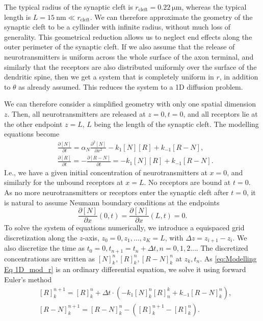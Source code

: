 \documentclass{article}
\begin{document}
The typical radius of the synaptic cleft is $r_{\text{cleft}}=\SI{0.22}{\micro \meter}$, whereas the typical length is $L = \SI{15}{\nano \meter} \ll r_{\text{cleft}}$. We can therefore approximate the geometry of the synaptic cleft to be a cyllinder with infinite radius, without much loss of generality. This geometrical reduction allows us to neglect end effects along the outer perimeter of the synaptic cleft. If we also assume that the release of neurotransmitters is uniform across the whole surface of the axon terminal, and similarly that the receptors are also distributed uniformly over the surface of the dendritic spine, then we get a system that is completely uniform in $r$, in addition to $\theta$ as already assumed. This reduces the system to a 1D diffusion problem.

We can therefore consider a simplified geometry with only one spatial dimension $z$.
Then, all neurotransmitters are released at $z = 0, t = 0$, and all receptors lie at the other endpoint $z = L$, $L$ being the length of the synaptic cleft.
The modelling equations become 
\begin{align}\label{eq:Modelling Eq 1D_mod_n}
        & \frac{\partial [N]}{\partial t} = \alpha_N \frac{\partial^2 [N]}{\partial x^2} - k_1 [N][R] + k_{-1}[R-N], \\
        \label{eq:Modelling Eq 1D_mod_r}
        &\frac{\partial [R]}{\partial t} = -\frac{\partial[R-N]}{\partial t} = -k_1 [N][R] + k_{-1}[R-N].
\end{align}
I.e., we have a given initial concentration of neurotransmitters at $x = 0$, and similarly for the unbound receptors at $x = L$.
No receptors are bound at $t = 0$.
As no more neurotransmitters or receptors enter the synaptic cleft after $t = 0$, it is natural to assume Neumann boundary conditions at the endpoints
\begin{equation}\label{eq:boundary}
        \frac{\partial [N]}{\partial x}(0, t) = \frac{\partial [N]}{\partial x} (L, t) = 0. 
\end{equation}
To solve the system of equations numerically, we introduce a equispaced grid discretization along the $z$-axis, $z_0 = 0, z_1, \hdots, z_K = L$, with $\Delta z = z_{i + 1} - z_i$.
We also discretize the time as $t_0 = 0, t_{n +1} = t_n + \Delta t, n = 0, 1, 2 \hdots$.
The discretized concentrations are written as $[N]_{k}^{n}, [R]_k^n, [R-N]_k^n$ at $z_k, t_n$.
As \eqref{eq:Modelling Eq 1D_mod_r} is an ordinary differential equation, we solve it using forward Euler's method
\begin{align*}
        &[R]_k^{n+1} = [R]_k^n + \Delta t \cdot (-k_1[N]_k^n[R]_n^k + k_{-1}[R-N]_k^n), \\
        &[R - N]_k^{n+1} = [R-N]_k^n -([R]_{k}^{n+1} - [R]_k^n).
\end{align*}
\end{document}
